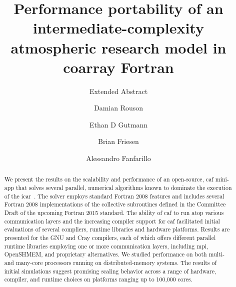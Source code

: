 \documentclass[sigconf, authordraft]{acmart}
\begin{document}
\title{Performance portability of an intermediate-complexity atmospheric research model in coarray Fortran}
\subtitle{Extended Abstract}

\author{Damian Rouson}
\renewcommand{\shortauthors}{D. Rouson et al.}

\author{Ethan D Gutmann}

\author{Brian Friesen}

\author{Alessandro Fanfarillo}

\begin{abstract}
We present the results on the scalability and performance of an open-source, \gls{caf} \gls{mini-app} that solves
several parallel, numerical algorithms known to dominate the execution of the \gls{icar}~\cite{gutmann2016intermediate}.
The solver employs standard Fortran 2008 features and includes several Fortran 2008 implementations of the collective
subroutines defined in the Committee Draft of the upcoming Fortran 2015 standard.  The ability of \gls{caf} to run atop various
communication layers and the increasing compiler support for \gls{caf} facilitated initial evaluations of several compliers,
runtime libraries and hardware platforms.  Results are presented for the GNU and Cray compilers, each of which offers
different parallel runtime libraries employing one or more communication layers, including \gls{mpi}, OpenSHMEM, and proprietary
alternatives.  We studied performance on both multi- and many-core processors running on distributed-memory systems.  The
results of initial simulations suggest promising scaling behavior across a range of hardware, compiler, and runtime choices
on platforms ranging up to 100,000 cores.
\end{abstract}
\end{document}
